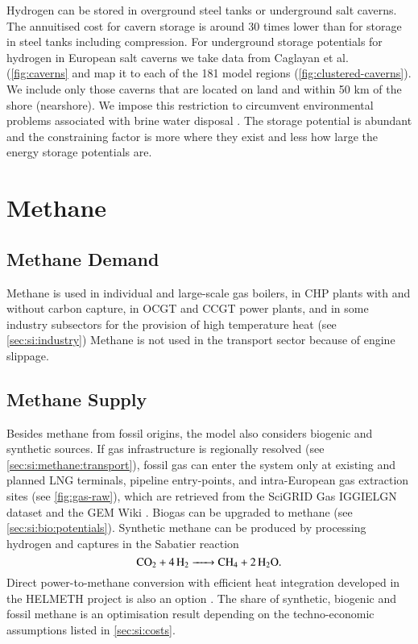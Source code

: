 Hydrogen can be stored in overground steel tanks or underground salt caverns.
The annuitised cost for cavern storage is around 30 times lower than for storage
in steel tanks including compression. For underground storage potentials for
hydrogen in European salt caverns we take data from Caglayan et
al.~ (\cref{fig:caverns} and map it to
each of the 181 model regions (\cref{fig:clustered-caverns}). We include only
those caverns that are located on land and within 50 km of the shore
(nearshore). We impose this restriction to circumvent environmental problems
associated with brine water disposal . The
storage potential is abundant and the constraining factor is more where they
exist and less how large the energy storage potentials are.

\section{Methane}
\label{sec:si:methane}

\subsection{Methane Demand}
\label{sec:si:methane:demand}

Methane is used in individual and large-scale gas boilers, in CHP plants with
and without carbon capture, in OCGT and CCGT power plants, and in some industry
subsectors for the provision of high temperature heat (see
\cref{sec:si:industry}) Methane is not used in the transport sector because of
engine slippage.

\subsection{Methane Supply}
\label{sec:si:methane:supply}

Besides methane from fossil origins, the model also considers biogenic and
synthetic sources. If gas infrastructure is regionally resolved (see
\cref{sec:si:methane:transport}), fossil gas can enter the system only at
existing and planned LNG terminals, pipeline entry-points, and intra-European
gas extraction sites (see \cref{fig:gas-raw}), which are retrieved from the
SciGRID Gas IGGIELGN dataset  and the GEM Wiki
\citeS{}. Biogas can be upgraded to methane (see \cref{sec:si:bio:potentials}).
Synthetic methane can be produced by processing hydrogen and captures \co in the
Sabatier reaction
\begin{equation}
    \ce{CO2 + 4H2 -> CH4 + 2H2O}.
\end{equation}
Direct power-to-methane conversion with efficient heat integration developed in
the HELMETH project is also an option . The
share of synthetic, biogenic and fossil methane is an optimisation result
depending on the techno-economic assumptions listed in \cref{sec:si:costs}.

